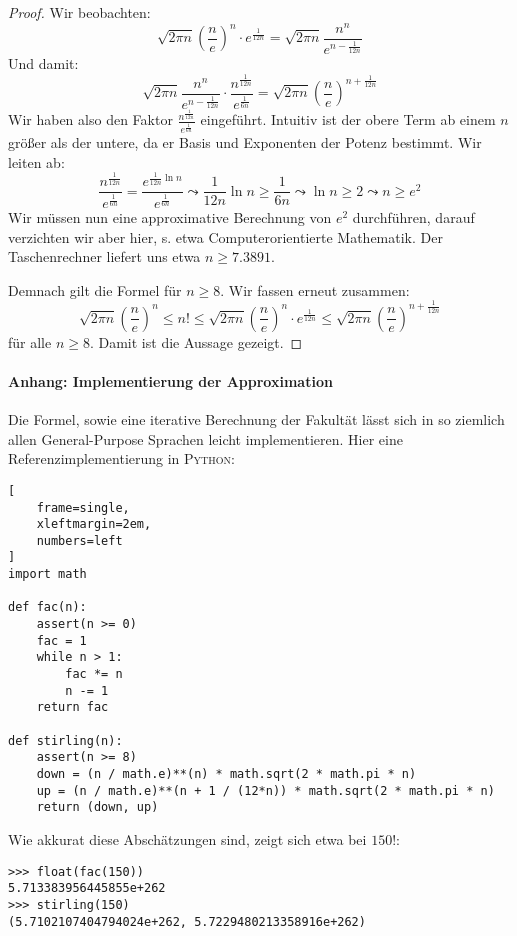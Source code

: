 \documentclass[10pt,fleqn]{article}
\theoremstyle{definition}
\theoremstyle{remark}
\begin{document}
\begin{proof}
    Wir beobachten:
    \[
        \sqrt{2 \pi n} \left(\frac{n}{e}\right)^n \cdot e^{\frac{1}{12n}} = \sqrt{2 \pi n} \frac{n^n}{e^{n-\frac{1}{12n}}}
    \]
    Und damit:
    \[
        \sqrt{2 \pi n} \frac{n^n}{e^{n-\frac{1}{12n}}} \cdot \frac{n^{\frac{1}{12n}}}{e^{\frac{1}{6n}}} = \sqrt{2 \pi n} \left(\frac{n}{e}\right)^{n+\frac{1}{12n}}
    \]
    Wir haben also den Faktor \(\frac{n^{\frac{1}{12n}}}{e^{\frac{1}{6n}}}\) eingeführt. Intuitiv ist der obere Term ab einem \(n\) größer als der untere, da er Basis und Exponenten der Potenz bestimmt. Wir leiten ab:
    \[
        \frac{n^{\frac{1}{12n}}}{e^{\frac{1}{6n}}} = \frac{e^{\frac{1}{12n}\ln{n}}}{e^{\frac{1}{6n}}} \leadsto \frac{1}{12n}\ln{n} \geq \frac{1}{6n} \leadsto \ln{n} \geq 2 \leadsto n \geq e^2
    \]
    Wir müssen nun eine approximative Berechnung von \(e^2\) durchführen, darauf verzichten wir aber hier, s. etwa Computerorientierte Mathematik. Der Taschenrechner liefert uns etwa \(n \geq 7.3891\).

    Demnach gilt die Formel für \(n \geq 8\). Wir fassen erneut zusammen:
    \[
        \sqrt{2 \pi n} \left(\frac{n}{e}\right)^n \leq n! \leq \sqrt{2 \pi n}\left(\frac{n}{e}\right)^n \cdot e^{\frac{1}{12n}} \leq \sqrt{2 \pi n} \left(\frac{n}{e}\right)^{n+\frac{1}{12n}}
    \]
    für alle \(n \geq 8\). Damit ist die Aussage gezeigt.
\end{proof}

\newpage

\appendix
\paragraph*{Anhang: Implementierung der Approximation} Die Formel, sowie eine iterative Berechnung der Fakultät lässt sich in so ziemlich allen General-Purpose Sprachen leicht implementieren. Hier eine Referenzimplementierung in \textsc{Python}:

\begin{lstlisting}[
    frame=single,
    xleftmargin=2em,
    numbers=left
]
import math

def fac(n):
    assert(n >= 0)
    fac = 1
    while n > 1:
        fac *= n
        n -= 1
    return fac

def stirling(n):
    assert(n >= 8)
    down = (n / math.e)**(n) * math.sqrt(2 * math.pi * n)
    up = (n / math.e)**(n + 1 / (12*n)) * math.sqrt(2 * math.pi * n)
    return (down, up)
\end{lstlisting}

Wie akkurat diese Abschätzungen sind, zeigt sich etwa bei \(150!\):

\begin{lstlisting}
>>> float(fac(150))
5.713383956445855e+262
>>> stirling(150)
(5.7102107404794024e+262, 5.7229480213358916e+262)
\end{lstlisting}
\end{document}
